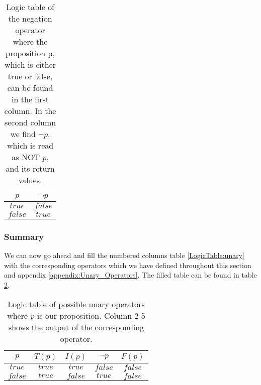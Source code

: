                 \begin{table}[h!]
                    \centering
                    \begin{tabular}{|c|c|}
                    	\hline
                    	  $p$   & $\neg{p}$ \\ \hline
                    	$true$  &  $false$  \\ \hline
                    	$false$ &  $true$   \\ \hline
                    \end{tabular}
                    \caption{Logic table of the negation operator where the proposition p, which is either true or false, can be found in the first column. In the second column we find $\neg p$, which is read as NOT $p$, and its return values.}
                    \label{LogicTable:Negation}
                \end{table}
            
            \subsubsection{Summary}
                
                We can now go ahead and fill the numbered columns table \ref{LogicTable:unary} with the corresponding operators which we have defined throughout this section and appendix \ref{appendix:Unary_Operators}. The filled table can be found in table \ref{LogicTable:unaryfilled}. 
                
                \begin{table}[h!]
                    \centering
                    \begin{tabular}{|c||c|c|c|c|}
                    	\hline
                    	  $p$   & $T(p)$ & $I(p)$  & $\neg p$ & $F(p)$  \\ \hline
                    	$true$  & $true$ & $true$  & $false$  & $false$ \\ \hline
                    	$false$ & $true$ & $false$ &  $true$  & $false$ \\ \hline
                    \end{tabular}
                    \caption{Logic table of possible unary operators where $p$ is our proposition. Column 2-5 shows the output of the corresponding operator.}
                    \label{LogicTable:unaryfilled}
                \end{table} 
                
